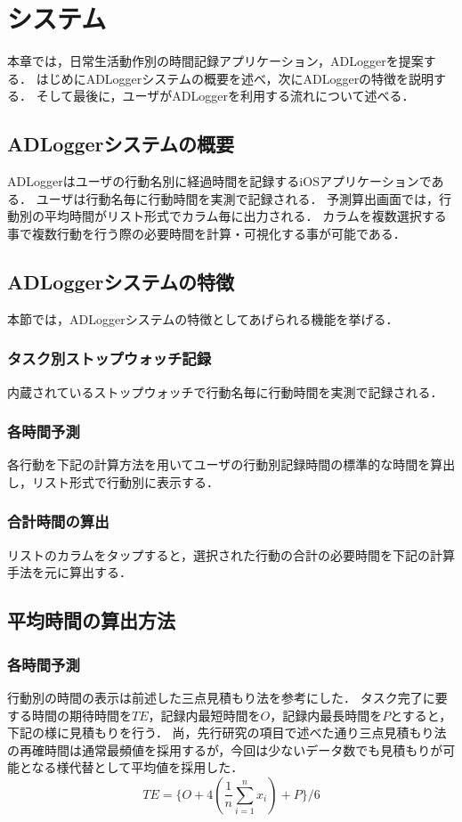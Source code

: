 \chapter{システム}
本章では，日常生活動作別の時間記録アプリケーション，ADLoggerを提案する．
はじめにADLoggerシステムの概要を述べ，次にADLoggerの特徴を説明する．
そして最後に，ユーザがADLoggerを利用する流れについて述べる．

\section{ADLoggerシステムの概要}
ADLoggerはユーザの行動名別に経過時間を記録するiOSアプリケーションである．
ユーザは行動名毎に行動時間を実測で記録される．
予測算出画面では，行動別の平均時間がリスト形式でカラム毎に出力される．
カラムを複数選択する事で複数行動を行う際の必要時間を計算・可視化する事が可能である．

\section{ADLoggerシステムの特徴}
本節では，ADLoggerシステムの特徴としてあげられる機能を挙げる．
\subsection{タスク別ストップウォッチ記録}
内蔵されているストップウォッチで行動名毎に行動時間を実測で記録される．
\subsection{各時間予測}
各行動を下記の計算方法を用いてユーザの行動別記録時間の標準的な時間を算出し，リスト形式で行動別に表示する．
\subsection{合計時間の算出}
リストのカラムをタップすると，選択された行動の合計の必要時間を下記の計算手法を元に算出する．

\section{平均時間の算出方法}
\subsection{各時間予測}
行動別の時間の表示は前述した三点見積もり法を参考にした．
タスク完了に要する時間の期待時間を$TE$，記録内最短時間を$O$，記録内最長時間を$P$とすると，下記の様に見積もりを行う．
尚，先行研究の項目で述べた通り三点見積もり法の再確時間は通常最頻値を採用するが，今回は少ないデータ数でも見積もりが可能となる様代替として平均値を採用した．
\[ TE=\{ O + 4(\frac{1}{n}\displaystyle\sum_{i=1}^{n}x_{i}) + P\}/6\]

